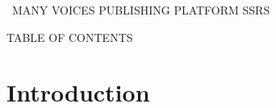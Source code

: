 \documentclass[letterpaper, 10pt, draftclsnofoot, compsoc, onecolumn]{IEEEtran}
\makeatletter
\newcommand\arraybslash{\let\\\@arraycr}
\makeatother
\begin{document}

\clearpage
{\centering
{\MakeUppercase{\ }}{\MakeUppercase{Many Voices Publishing Platform SSRS}}
\par}

{\centering
TABLE OF CONTENTS
\par}

\setcounter{tocdepth}{9}
\tableofcontents


\clearpage

\setcounter{page}{1}\pagestyle{fancy}
\section[Introduction]{\rmfamily\bfseries\color{black} Introduction}
\end{document}
